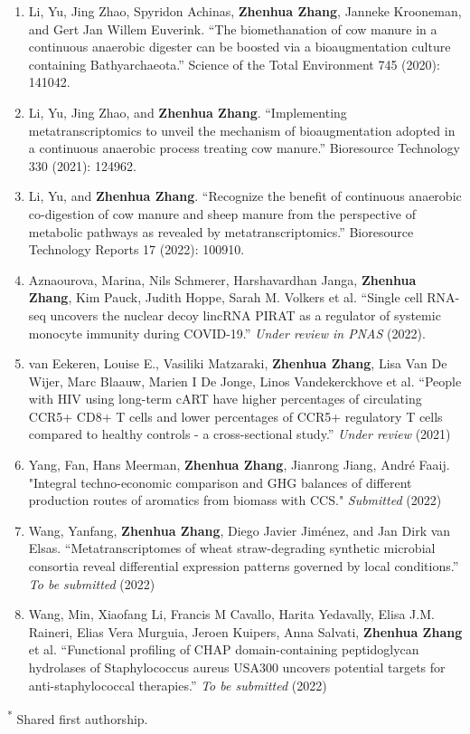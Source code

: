 \documentclass{book}
\begin{document}
\begin{refsection}
\begin{enumerate}
  \item Li, Yu, Jing Zhao, Spyridon Achinas, \textbf{Zhenhua Zhang}, Janneke Krooneman, and Gert Jan Willem Euverink. \enquote{The biomethanation of cow manure in a continuous anaerobic digester can be boosted via a bioaugmentation culture containing Bathyarchaeota.} Science of the Total Environment 745 (2020): 141042.
  \item Li, Yu, Jing Zhao, and \textbf{Zhenhua Zhang}. \enquote{Implementing metatranscriptomics to unveil the mechanism of bioaugmentation adopted in a continuous anaerobic process treating cow manure.} Bioresource Technology 330 (2021): 124962.
  \item Li, Yu, and \textbf{Zhenhua Zhang}. \enquote{Recognize the benefit of continuous anaerobic co-digestion of cow manure and sheep manure from the perspective of metabolic pathways as revealed by metatranscriptomics.} Bioresource Technology Reports 17 (2022): 100910.
  \item Aznaourova, Marina, Nils Schmerer, Harshavardhan Janga, \textbf{Zhenhua Zhang}, Kim Pauck, Judith Hoppe, Sarah M. Volkers et al. \enquote{Single cell RNA-seq uncovers the nuclear decoy lincRNA PIRAT as a regulator of systemic monocyte immunity during COVID-19.} \textit{Under review in PNAS} (2022).
  \item van Eekeren, Louise E., Vasiliki Matzaraki, \textbf{Zhenhua Zhang}, Lisa Van De Wijer, Marc Blaauw, Marien I De Jonge, Linos Vandekerckhove et al. \enquote{People with HIV using long-term cART have higher percentages of circulating CCR5+ CD8+ T cells and lower percentages of CCR5+ regulatory T cells compared to healthy controls - a cross-sectional study.} \textit{Under review} (2021)
  \item Yang, Fan, Hans Meerman, \textbf{Zhenhua Zhang}, Jianrong Jiang, André Faaij. "Integral techno-economic comparison and GHG balances of different production routes of aromatics from biomass with CCS." \textit{Submitted} (2022)
  \item Wang, Yanfang, \textbf{Zhenhua Zhang}, Diego Javier Jiménez, and Jan Dirk van Elsas. \enquote{Metatranscriptomes of wheat straw-degrading synthetic microbial consortia reveal differential expression patterns governed by local conditions.} \textit{To be submitted} (2022)
  \item Wang, Min, Xiaofang Li, Francis M Cavallo, Harita Yedavally, Elisa J.M. Raineri, Elias Vera Murguia, Jeroen Kuipers, Anna Salvati, \textbf{Zhenhua Zhang} et al. \enquote{Functional profiling of CHAP domain-containing peptidoglycan hydrolases of Staphylococcus aureus USA300 uncovers potential targets for anti-staphylococcal therapies.} \textit{To be submitted} (2022)
\end{enumerate}

\vspace{1em}
\textsuperscript{*} Shared first authorship.

\end{refsection}
\end{document}
